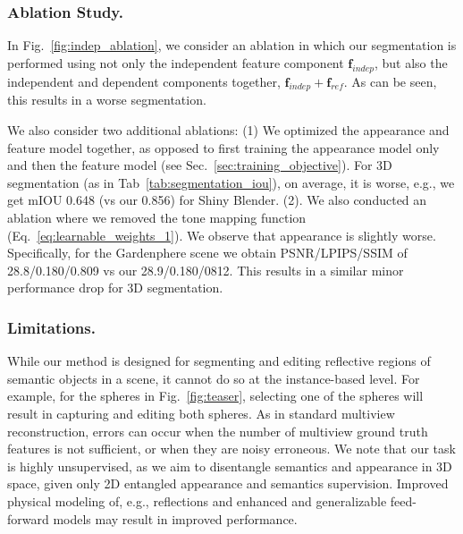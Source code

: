 \subsubsection{Ablation Study.}


In Fig.~\ref{fig:indep_ablation}, we consider an ablation in which our segmentation is performed using not only the independent feature component $\mathbf{f}_{indep}$, but also the independent and dependent components together, $\mathbf{f}_{indep} + \mathbf{f}_{ref}$. As can be seen, this results in a worse segmentation. 

We also consider two additional ablations: (1) We optimized the appearance and feature model together, as opposed to first training the appearance model only and then the feature model (see Sec.~\ref{sec:training_objective}). For 3D segmentation (as in Tab~\ref{tab:segmentation_iou}), on average, it is worse, e.g., we get mIOU 0.648 (vs our 0.856) for Shiny Blender. (2). We also conducted an ablation where we removed the tone mapping function (Eq.~\ref{eq:learnable_weights_1}). We observe that appearance is slightly worse. Specifically, for the Gardenphere scene we obtain PSNR/LPIPS/SSIM of 28.8/0.180/0.809 vs our 28.9/0.180/0812. This results in a similar minor performance drop for 3D segmentation.



\subsubsection{Limitations.}

While our method is designed for segmenting and editing reflective regions of semantic objects in a scene, it cannot do so at the instance-based level.
For example, for the spheres in Fig.~\ref{fig:teaser}, selecting one of the spheres will result in capturing and editing both spheres. 
As in standard multiview reconstruction, errors can occur when the number of multiview ground truth features is not sufficient, or when they are noisy erroneous. 
We note that our task is highly unsupervised, as we aim to disentangle semantics and appearance in 3D space, given only 2D entangled appearance and semantics supervision. Improved physical modeling of, e.g., reflections and enhanced and generalizable feed-forward models may result in improved performance. 


